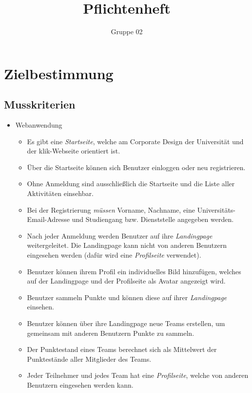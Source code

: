 \documentclass[10pt,a4paper]{article}
\author{Gruppe 02}
\title{Pflichtenheft}
\begin{document}
\maketitle
\tableofcontents
\section{Zielbestimmung}
	\subsection{Musskriterien}
	\begin{itemize}
		\item Webanwendung
		\begin{itemize}
			\item Es gibt eine \emph{Startseite}, welche am Corporate Design der Universität und der klik-Webseite orientiert ist.
                        \item Über die Startseite können sich Benutzer einloggen oder neu registrieren.
			\item Ohne Anmeldung sind ausschließlich die Startseite und die Liste aller Aktivitäten einsehbar.
			\item Bei der Registrierung \emph{müssen} Vorname, Nachname, eine Universitäts-Email-Adresse und Studiengang bzw. Dienststelle angegeben werden.
                        \item Nach jeder Anmeldung werden Benutzer auf ihre \emph{Landingpage} weitergeleitet. Die Landingpage kann nicht von anderen Benutzern  eingesehen werden (dafür wird eine \emph{Profilseite} verwendet).
                        \item Benutzer können ihrem Profil ein individuelles Bild hinzufügen, welches auf der Landingpage und der Profilseite als Avatar angezeigt wird.
                        \item Benutzer sammeln Punkte und können diese auf ihrer \emph{Landingpage} einsehen. 
                        \item Benutzer können über ihre Landingpage neue Teams erstellen, um gemeinsam mit anderen Benutzern Punkte zu sammeln.
                        \item Der Punktestand eines Teams berechnet sich als Mittelwert der Punktestände aller Mitglieder des Teams.
                        \item Jeder Teilnehmer und jedes Team hat eine \emph{Profilseite}, welche von anderen Benutzern eingesehen werden kann.

\end{itemize}
\end{itemize}
\end{document}
